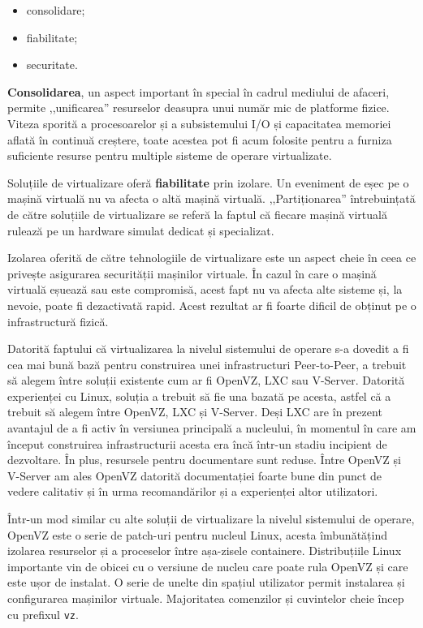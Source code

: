 \begin{itemize}
  \item consolidare;
  \item fiabilitate;
  \item securitate.
\end{itemize}

\textbf{Consolidarea}, un aspect important în special în cadrul mediului
de afaceri, permite ,,unificarea'' resurselor deasupra unui număr mic
de platforme fizice. Viteza sporită a procesoarelor și a subsistemului I/O
și capacitatea memoriei aflată în continuă creștere, toate acestea pot
fi acum folosite pentru a furniza suficiente resurse pentru multiple
sisteme de operare virtualizate.

Soluțiile de virtualizare oferă \textbf{fiabilitate} prin izolare. Un
eveniment de eșec pe o mașină virtuală nu va afecta o altă mașină virtuală.
,,Partiționarea'' întrebuințată de către soluțiile de virtualizare se
referă la faptul că fiecare mașină virtuală rulează pe un hardware simulat
dedicat și specializat.

Izolarea oferită de către tehnologiile de virtualizare este un aspect cheie
în ceea ce privește asigurarea securității mașinilor virtuale. În cazul
în care o mașină virtuală eșuează sau este compromisă, acest fapt nu va
afecta alte sisteme și, la nevoie, poate fi dezactivată rapid. Acest
rezultat ar fi foarte dificil de obținut pe o infrastructură fizică.

Datorită faptului că virtualizarea la nivelul sistemului de operare s-a
dovedit a fi cea mai bună bază pentru construirea unei infrastructuri
Peer-to-Peer, a trebuit să alegem între soluții existente cum ar fi
OpenVZ, LXC sau V-Server. Datorită experienței cu Linux, soluția a trebuit
să fie una bazată pe acesta, astfel că a trebuit să alegem între OpenVZ,
LXC și V-Server. Deși LXC are în prezent avantajul de a fi activ în versiunea
principală a nucleului, în momentul în care am început construirea
infrastructurii acesta era încă într-un stadiu incipient de dezvoltare.
În plus, resursele pentru documentare sunt reduse. Între OpenVZ și V-Server
am ales OpenVZ datorită documentației foarte bune din punct de vedere
calitativ și în urma recomandărilor și a experienței altor utilizatori.

Într-un mod similar cu alte soluții de virtualizare la nivelul sistemului
de operare, OpenVZ este o serie de patch-uri pentru nucleul Linux,
acesta îmbunătățind izolarea resurselor și a proceselor între așa-zisele
containere. Distribuțiile Linux importante vin de obicei cu o versiune
de nucleu care poate rula OpenVZ și care este ușor de instalat. O
serie de unelte din spațiul utilizator permit instalarea și configurarea
mașinilor virtuale. Majoritatea comenzilor și cuvintelor cheie încep cu
prefixul \texttt{vz}.

